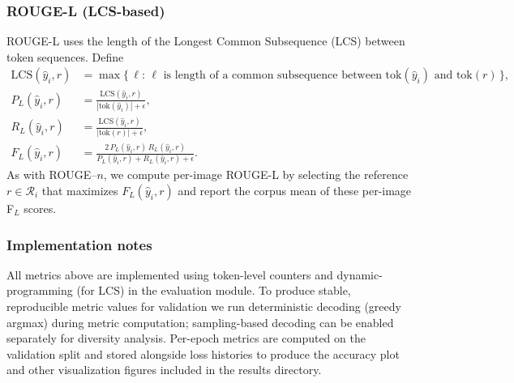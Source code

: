 \subsubsection{ROUGE-L (LCS-based)}
ROUGE-L uses the length of the Longest Common Subsequence (LCS) between token sequences. Define
\begin{align}
    \mathrm{LCS}(\hat{y}_i, r) &= \max\{\,\ell:\,\ell \text{ is length of a common subsequence between }\mathrm{tok}(\hat{y}_i)\text{ and }\mathrm{tok}(r)\,\}, \\
    P_{L}(\hat{y}_i,r) &= \frac{\mathrm{LCS}(\hat{y}_i,r)}{|\mathrm{tok}(\hat{y}_i)| + \epsilon}, \\
    R_{L}(\hat{y}_i,r) &= \frac{\mathrm{LCS}(\hat{y}_i,r)}{|\mathrm{tok}(r)| + \epsilon}, \\
    F_{L}(\hat{y}_i,r) &= \frac{2\,P_{L}(\hat{y}_i,r)\,R_{L}(\hat{y}_i,r)}{P_{L}(\hat{y}_i,r)+R_{L}(\hat{y}_i,r)+\epsilon}.
\end{align}
As with ROUGE--$n$, we compute per-image ROUGE-L by selecting the reference $r\in\mathcal{R}_i$ that maximizes $F_{L}(\hat{y}_i,r)$ and report the corpus mean of these per-image F$_L$ scores.

\subsubsection{Implementation notes}
All metrics above are implemented using token-level counters and dynamic-programming (for LCS) in the evaluation module. To produce stable, reproducible metric values for validation we run deterministic decoding (greedy argmax) during metric computation; sampling-based decoding can be enabled separately for diversity analysis. Per-epoch metrics are computed on the validation split and stored alongside loss histories to produce the accuracy plot and other visualization figures included in the results directory.

